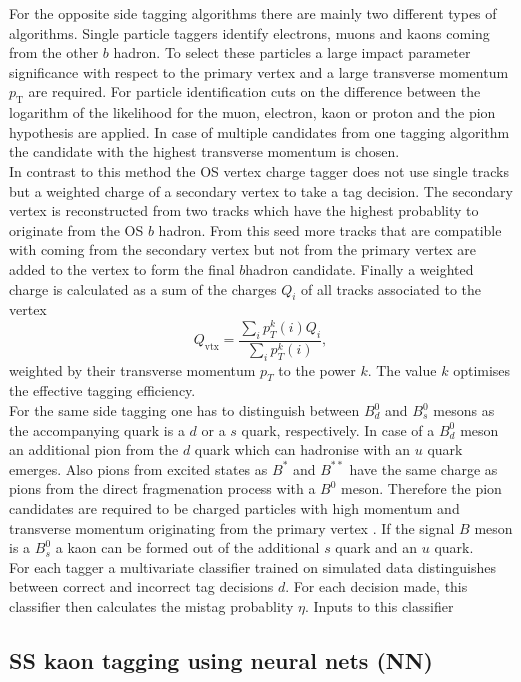 \documentclass{PoS}
\begin{document}
For the opposite side tagging algorithms there are mainly two different types of algorithms. Single particle taggers identify electrons, muons and kaons coming from the other $b$ hadron. To select these particles a large impact parameter significance  with respect to the primary vertex and a large transverse momentum $p_\text{T}$ are required. For particle identification cuts on the difference between the logarithm of the likelihood for the muon, electron, kaon or proton and the pion hypothesis are applied. In case of multiple candidates from one tagging algorithm the candidate with the highest transverse momentum is chosen.\\
In contrast to this method the OS vertex charge tagger does not use single tracks but a weighted charge of a secondary vertex to take a tag decision. The secondary vertex is reconstructed from two tracks which have the highest probablity to originate from the OS $b$ hadron. From this seed more tracks that are compatible with coming from the secondary vertex but not from the primary vertex are added to the vertex to form the final $b$hadron candidate. Finally a weighted charge is calculated as a sum of the charges $Q_i$ of all tracks associated to the vertex
\begin{equation}
Q_\text{vtx}=\frac{\sum_i p_T^k(i)Q_i}{\sum_i p_T^k(i)},
\end{equation} 
weighted by their transverse momentum $p_T$ to the power $k$. The value $k$ optimises the effective tagging efficiency.\\
For the same side tagging one has to distinguish between $B_d^0$ and $B_s^0$ mesons as the accompanying quark is a $d$ or a $s$ quark, respectively. In case of a $B_d^0$ meson an additional pion from the $d$ quark which can hadronise with an $u$ quark emerges. Also pions from excited states as $B^*$ and $B^{**}$ have the same charge as pions from the direct fragmenation process with a $B^0$ meson. Therefore the pion candidates are required to be charged particles with high momentum and transverse momentum originating from the primary vertex \cite{10}. If the signal $B$ meson is a $B_s^0$ a kaon can be formed out of the additional $s$ quark and an $u$ quark.\\
For each tagger a multivariate classifier trained on simulated data distinguishes between correct and incorrect tag decisions $d$. For each decision made, this classifier then calculates the mistag probablity $\eta$. Inputs to this classifier 

\subsection{SS kaon tagging using neural nets (NN)}
\end{document}

